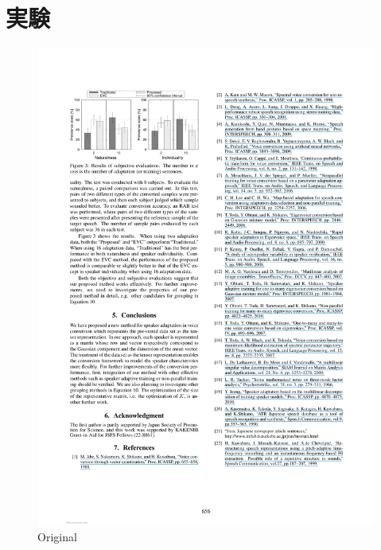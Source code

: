 \documentclass[a4paper, dvipdfmx]{jarticle}
\begin{document}
\section{実験}
\begin{figure}[t]
    \begin{minipage}{0.33\linewidth}
        \centering
        \includegraphics[clip, width=\linewidth]{fig/original.jpg}
        {\footnotesize Original}
    \end{minipage}%
    \begin{minipage}{0.33\columnwidth}
        \centering

\end{minipage}
\end{figure}
\end{document}
